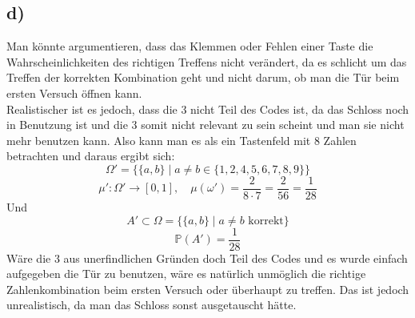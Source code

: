 \documentclass{article} %
\begin{document}
\subsection{d)}
Man könnte argumentieren, dass das Klemmen oder Fehlen einer Taste die Wahrscheinlichkeiten des richtigen Treffens nicht verändert, da es schlicht um das Treffen der korrekten Kombination geht und nicht darum, ob man die Tür beim ersten Versuch öffnen kann. \\ 
Realistischer ist es jedoch, dass die 3 nicht Teil des Codes ist, da das Schloss noch in Benutzung ist und die 3 somit nicht relevant zu sein scheint und man sie nicht mehr benutzen kann. Also kann man es als ein Tastenfeld mit 8 Zahlen betrachten und daraus ergibt sich:  
\[
\Omega' = \{\{a,b\} \mid a \neq b \in \{1,2,4,5,6,7,8,9\}\}
\]
\[
\mu': \Omega' \rightarrow [0,1], \quad \mu(\omega') = \frac{2}{8 \cdot 7} = \frac{2}{56} = \frac{1}{28}
\]
Und 
\[
A' \subset \Omega = \{\{a,b\} \mid a \neq b \text{ korrekt}\}
\]
\[
\mathbb{P}(A') = \frac{1}{28}
\]
Wäre die 3 aus unerfindlichen Gründen doch Teil des Codes und es wurde einfach aufgegeben die Tür zu benutzen, wäre es natürlich unmöglich die richtige Zahlenkombination beim ersten Versuch oder überhaupt zu treffen. Das ist jedoch unrealistisch, da man das Schloss sonst ausgetauscht hätte.
\end{document}
